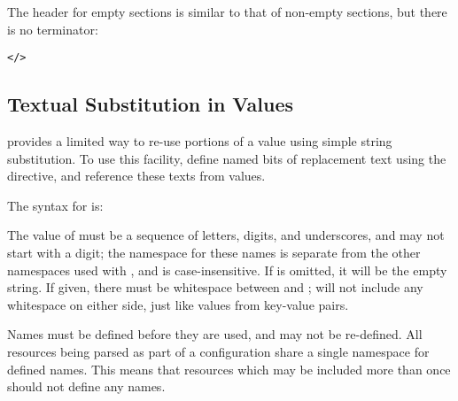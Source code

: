 \documentclass{howto}
\begin{document}


The header for empty sections is similar to that of non-empty
sections, but there is no terminator:

\begin{alltt}
<  />
\end{alltt}


\subsection{Textual Substitution in Values}

 provides a limited way to re-use portions of a value
using simple string substitution.  To use this facility, define named
bits of replacement text using the  directive, and
reference these texts from values.

The syntax for  is:

\begin{alltt}
%define \var{name} \optional{\var{value}}
\end{alltt}

The value of  must be a sequence of letters, digits, and
underscores, and may not start with a digit; the namespace for these
names is separate from the other namespaces used with
, and is case-insensitive.  If  is
omitted, it will be the empty string.  If given, there must be
whitespace between  and ;  will not
include any whitespace on either side, just like values from key-value
pairs.

Names must be defined before they are used, and may not be
re-defined.  All resources being parsed as part of a configuration
share a single namespace for defined names.  This means that resources
which may be included more than once should not define any names.
\end{document}
